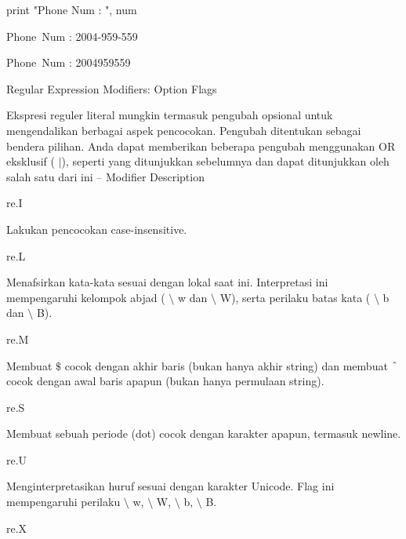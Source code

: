 \begin {enumerate}
\noindent 
print "Phone Num : ", num \par
\vspace{12pt}
\noindent 
Phone~Num :  2004-959-559 \par
\noindent 
Phone~Num :  2004959559 \par
\vspace{12pt}
\noindent 
Regular Expression Modifiers: Option Flags \par
Ekspresi reguler literal mungkin termasuk pengubah opsional untuk mengendalikan berbagai aspek pencocokan. Pengubah ditentukan sebagai bendera pilihan. Anda dapat memberikan beberapa pengubah menggunakan OR eksklusif ( $  \vert  $), seperti yang ditunjukkan sebelumnya dan dapat ditunjukkan oleh salah satu dari ini – Modifier Description  \par
\noindent 
re.I \hspace*{0.5in}  \par
\noindent 
Lakukan pencocokan case-insensitive. \par
\vspace{12pt}
\noindent 
re.L \hspace*{0.5in}  \par
\noindent 
Menafsirkan kata-kata sesuai dengan lokal saat ini. Interpretasi ini mempengaruhi kelompok abjad ( $  \setminus  $ w dan  $  \setminus  $ W), serta perilaku batas kata ( $  \setminus  $ b dan  $  \setminus  $ B). \par
\vspace{12pt}
\noindent 
re.M \hspace*{0.5in}  \par
\noindent 
Membuat  $  \$  $ cocok dengan akhir baris (bukan hanya akhir string) dan membuat  $  \string^  $ cocok dengan awal baris apapun (bukan hanya permulaan string). \par
\vspace{12pt}
\noindent 
re.S \hspace*{0.5in}  \par
\noindent 
Membuat sebuah periode (dot) cocok dengan karakter apapun, termasuk newline. \par
\noindent 
re.U \hspace*{0.5in}  \par
\noindent 
Menginterpretasikan huruf sesuai dengan karakter Unicode. Flag ini mempengaruhi perilaku  $  \setminus  $ w,  $  \setminus  $ W,  $  \setminus  $ b,  $  \setminus  $ B. \par
\vspace{12pt}
\noindent 
re.X \hspace*{0.5in}  \par

\end{enumerate}
